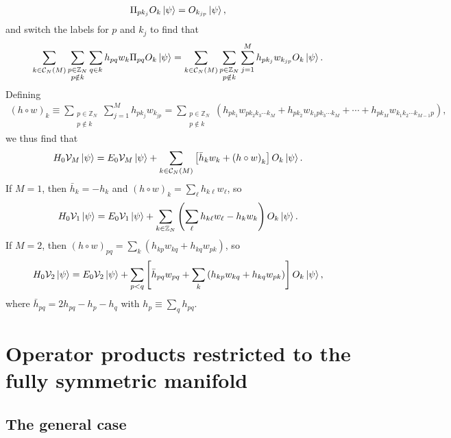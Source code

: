 \documentclass[nofootinbib,notitlepage,11pt]{revtex4-2}
\newcommand{\p}[1]{\left(#1\right)} %
\renewcommand{\sp}[1]{\left[#1\right]} %
\newcommand{\1}{\mathds{1}}
\newcommand{\C}{\mathcal{C}}
\newcommand{\V}{\mathcal{V}}
\newcommand{\ZZ}{\mathbb{Z}}
\begin{document}
\begin{align}
  \Pi_{p k_j} O_k \ket\psi = O_{k_{jp}}\ket\psi,
\end{align}
and switch the labels for $p$ and $k_j$ to find that
\begin{align}
  \sum_{k\in\C_N\p{M}} \sum_{\substack{p\in\ZZ_N\\p\notin k}} \sum_{q\in k}
  h_{pq} w_k  \Pi_{pq} O_k \ket\psi
  = \sum_{k\in\C_N\p{M}} \sum_{\substack{p\in\ZZ_N\\p\notin k}}
  \sum_{j=1}^M h_{pk_j} w_{k_{jp}} O_k \ket\psi.
\end{align}
Defining
\begin{align}
  \p{h\circ w}_k
  \equiv \sum_{\substack{p\in\ZZ_N\\p\notin k}} \sum_{j=1}^M
  h_{pk_j} w_{k_{jp}}
  = \sum_{\substack{p\in\ZZ_N\\p\notin k}}
  \p{h_{pk_1} w_{pk_2k_3\cdots k_M}
    + h_{pk_2} w_{k_1pk_3\cdots k_M}
    + \cdots + h_{pk_M} w_{k_1k_2\cdots k_{M-1} p}},
\end{align}
we thus find that
\begin{align}
  H_0 \V_M \ket\psi
  = E_0 \V_M \ket\psi + \sum_{k\in\C_N\p{M}}
  \sp{\bar h_k w_k + \p{h\circ w}_k} O_k \ket\psi.
\end{align}
If $M=1$, then $\bar h_k=-h_k$ and
$\p{h\circ w}_k=\sum_\ell h_{k\ell}w_\ell$, so
\begin{align}
  H_0 \V_1 \ket\psi
  = E_0 \V_1 \ket\psi + \sum_{k\in\ZZ_N}
  \p{\sum_\ell h_{k\ell} w_\ell - h_k w_k} O_k \ket\psi.
\end{align}
If $M=2$, then
$\p{h\circ w}_{pq}=\sum_k\p{h_{kp} w_{kq}+h_{kq}w_{pk}}$, so
\begin{align}
  H_0 \V_2 \ket\psi
  = E_0 \V_2 \ket\psi + \sum_{p<q}
  \sp{\bar h_{pq} w_{pq} + \sum_k\p{h_{kp} w_{kq} + h_{kq} w_{pk}}}
  O_k \ket\psi,
\end{align}
where $\bar h_{pq}=2h_{pq}-h_p-h_q$ with $h_p\equiv\sum_qh_{pq}$.

\section{Operator products restricted to the fully symmetric manifold}
\label{sec:sym_prod}

\subsection{The general case}
\end{document}
